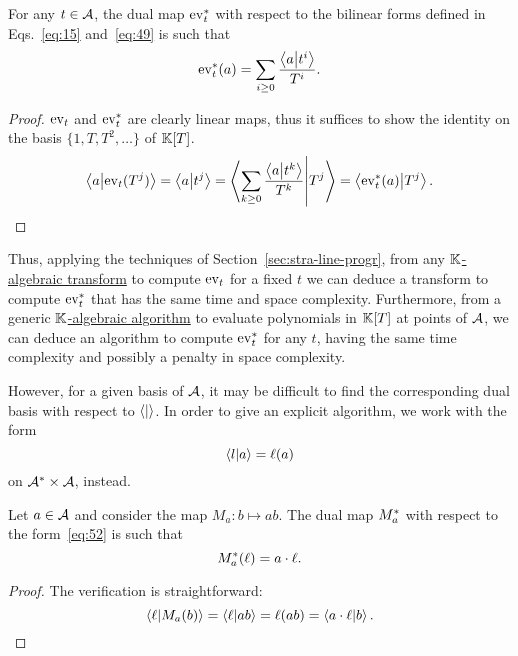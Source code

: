 \begin{lemma}
  \label{th:shoup}
  For any $t\in\mathcal{A}$, the dual map $\operatorname{ev}_t^\ast$ with respect to
  the bilinear forms defined in Eqs.~\eqref{eq:15} and~\eqref{eq:49}
  is such that
  \begin{equation}
    \label{eq:50}
    \operatorname{ev}_t^\ast(a) = \sum_{i\ge0}\frac{\left\langle a \middle| t^i \right\rangle}{T^{i}}
    \text{.}
  \end{equation}
\end{lemma}
\begin{proof}
  $\operatorname{ev}_t$ and $\operatorname{ev}_t^\ast$ are clearly linear maps, thus it suffices
  to show the identity on the basis $\{1,T,T^2,\ldots\}$ of $\mathbb{K}[T]$.
  \begin{equation}
    \label{eq:51}
    \left\langle a \middle| \operatorname{ev}_t(T^j) \right\rangle =
    \left\langle a \middle| t^j \right\rangle =
    \left\langle \sum_{k\ge0}\frac{\left\langle a \middle| t^k \right\rangle}{T^k} \middle| T^j \right\rangle =
    \left\langle \operatorname{ev}_t^\ast(a) \middle| T^j \right\rangle
    \text{.}
  \end{equation}
\end{proof}

Thus, applying the techniques of Section~\ref{sec:stra-line-progr},
from any \hyperref[def:algebraic-transform]{$\mathbb{K}$-algebraic transform}
to compute $\operatorname{ev}_t$ for a fixed $t$ we can deduce a transform to
compute $\operatorname{ev}_t^\ast$ that has the same time and space
complexity. Furthermore, from a generic
\hyperref[sec:r-algebr-algor]{$\mathbb{K}$-algebraic algorithm} to evaluate
polynomials in $\mathbb{K}[T]$ at points of $\mathcal{A}$, we can deduce an
algorithm to compute $\operatorname{ev}_t^\ast$ for any $t$, having the same time
complexity and possibly a penalty in space complexity.

However, for a given basis of $\mathcal{A}$, it may be difficult to find
the corresponding dual basis with respect to $\left\langle  \middle|  \right\rangle$. In order
to give an explicit algorithm, we work with the form
\begin{equation}
  \label{eq:52}
  \left\langle l \middle| a \right\rangle = \ell(a)
\end{equation}
on $\mathcal{A}^\ast\times\mathcal{A}$, instead.

\begin{lemma}
  Let $a\in\mathcal{A}$ and consider the map $M_a:b\mapsto ab$. The dual
  map $M_a^\ast$ with respect to the form~\eqref{eq:52} is
  such that
  \begin{equation}
    \label{eq:53}
    M_a^\ast(\ell) = a\cdot\ell
    \text{.}
  \end{equation}
\end{lemma}
\begin{proof}
  The verification is straightforward:
  \begin{equation}
    \label{eq:54}
    \left\langle \ell \middle| M_a(b) \right\rangle = \left\langle \ell \middle| ab \right\rangle = \ell(ab) =
    \left\langle a\cdot\ell \middle| b \right\rangle
    \text{.}
  \end{equation}
\end{proof}

